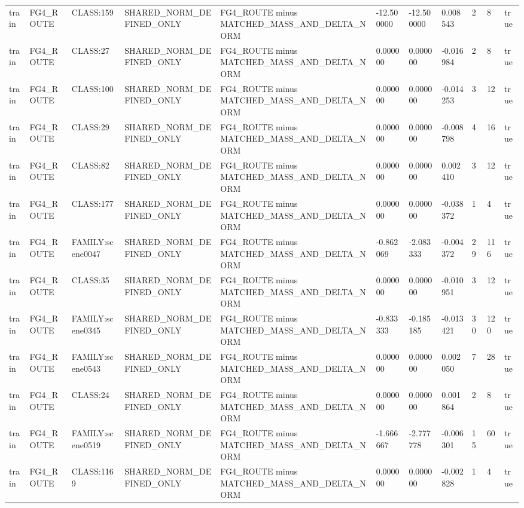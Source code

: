 \begin{tabular}{lllllllllll}
train & FG4\_ROUTE & CLASS:159 & SHARED\_NORM\_DEFINED\_ONLY & FG4\_ROUTE minus MATCHED\_MASS\_AND\_DELTA\_NORM & -12.500000 & -12.500000 & 0.008543 & 2 & 8 & true \\
train & FG4\_ROUTE & CLASS:27 & SHARED\_NORM\_DEFINED\_ONLY & FG4\_ROUTE minus MATCHED\_MASS\_AND\_DELTA\_NORM & 0.000000 & 0.000000 & -0.016984 & 2 & 8 & true \\
train & FG4\_ROUTE & CLASS:100 & SHARED\_NORM\_DEFINED\_ONLY & FG4\_ROUTE minus MATCHED\_MASS\_AND\_DELTA\_NORM & 0.000000 & 0.000000 & -0.014253 & 3 & 12 & true \\
train & FG4\_ROUTE & CLASS:29 & SHARED\_NORM\_DEFINED\_ONLY & FG4\_ROUTE minus MATCHED\_MASS\_AND\_DELTA\_NORM & 0.000000 & 0.000000 & -0.008798 & 4 & 16 & true \\
train & FG4\_ROUTE & CLASS:82 & SHARED\_NORM\_DEFINED\_ONLY & FG4\_ROUTE minus MATCHED\_MASS\_AND\_DELTA\_NORM & 0.000000 & 0.000000 & 0.002410 & 3 & 12 & true \\
train & FG4\_ROUTE & CLASS:177 & SHARED\_NORM\_DEFINED\_ONLY & FG4\_ROUTE minus MATCHED\_MASS\_AND\_DELTA\_NORM & 0.000000 & 0.000000 & -0.038372 & 1 & 4 & true \\
train & FG4\_ROUTE & FAMILY:scene0047 & SHARED\_NORM\_DEFINED\_ONLY & FG4\_ROUTE minus MATCHED\_MASS\_AND\_DELTA\_NORM & -0.862069 & -2.083333 & -0.004372 & 29 & 116 & true \\
train & FG4\_ROUTE & CLASS:35 & SHARED\_NORM\_DEFINED\_ONLY & FG4\_ROUTE minus MATCHED\_MASS\_AND\_DELTA\_NORM & 0.000000 & 0.000000 & -0.010951 & 3 & 12 & true \\
train & FG4\_ROUTE & FAMILY:scene0345 & SHARED\_NORM\_DEFINED\_ONLY & FG4\_ROUTE minus MATCHED\_MASS\_AND\_DELTA\_NORM & -0.833333 & -0.185185 & -0.013421 & 30 & 120 & true \\
train & FG4\_ROUTE & FAMILY:scene0543 & SHARED\_NORM\_DEFINED\_ONLY & FG4\_ROUTE minus MATCHED\_MASS\_AND\_DELTA\_NORM & 0.000000 & 0.000000 & 0.002050 & 7 & 28 & true \\
train & FG4\_ROUTE & CLASS:24 & SHARED\_NORM\_DEFINED\_ONLY & FG4\_ROUTE minus MATCHED\_MASS\_AND\_DELTA\_NORM & 0.000000 & 0.000000 & 0.001864 & 2 & 8 & true \\
train & FG4\_ROUTE & FAMILY:scene0519 & SHARED\_NORM\_DEFINED\_ONLY & FG4\_ROUTE minus MATCHED\_MASS\_AND\_DELTA\_NORM & -1.666667 & -2.777778 & -0.006301 & 15 & 60 & true \\
train & FG4\_ROUTE & CLASS:1169 & SHARED\_NORM\_DEFINED\_ONLY & FG4\_ROUTE minus MATCHED\_MASS\_AND\_DELTA\_NORM & 0.000000 & 0.000000 & -0.002828 & 1 & 4 & true \\

\end{tabular}
